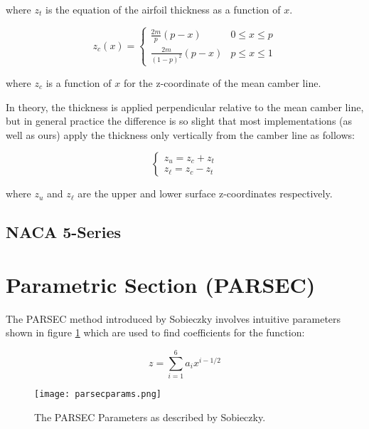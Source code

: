 where $z_t$ is the equation of the airfoil thickness as a function of $x$.

\begin{equation}
z_c(x) = 
\begin{cases} 
\frac{2m}{p} (p-x) & 0 \leq x\leq p \\
\frac{2m}{(1-p)^2} (p-x)  & p\leq x\leq 1
\end{cases}
\end{equation}

where $z_c$ is a function of $x$ for the z-coordinate of the mean camber line.

In theory, the thickness is applied perpendicular relative to the mean camber line, but in general practice the difference is so slight that most implementations (as well as ours) apply the thickness only vertically from the camber line as follows:

\begin{equation}
\begin{cases}
z_u = z_c + z_t\\
z_\ell = z_c - z_t
\end{cases}
\end{equation}

where $z_u$ and $z_\ell$ are the upper and lower surface z-coordinates respectively.

\subsection{NACA 5-Series}

\section{Parametric Section (PARSEC)}

The PARSEC method introduced by Sobieczky \cite{Sobieczky1999} involves intuitive parameters shown in figure \ref{fig:parsec} which are used to find coefficients for the function:  

\begin{equation}
z = \sum_{i=1}^6 a_i x^{i-1/2}
\end{equation}


\begin{figure}[h!]
	\begin{center}
		\texttt{[image: parsecparams.png]}
	\end{center}
	\caption{The PARSEC Parameters as described by Sobieczky. \cite{Sobieczky1999}}
	\label{fig:parsec}
\end{figure}


